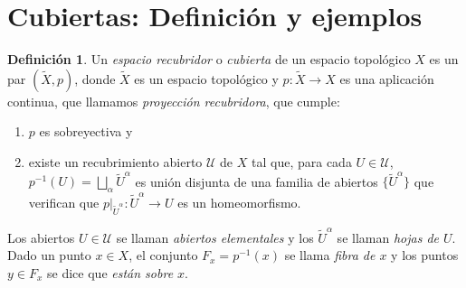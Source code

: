 \documentclass[12pt,a4paper]{book}
\theoremstyle{definition} \newtheorem{defn}[thm]{Definición}
\theoremstyle{definition} \newtheorem{ejemplo}[thm]{Ejemplo}
\theoremstyle{definition} \newtheorem{ejercicio}[thm]{Ejercicio}
\theoremstyle{remark} \newtheorem*{obs}{Observación}
\def\XX{\tilde{X}}
\begin{document}
\section{Cubiertas: Definición y ejemplos}
\begin{defn}
  Un \emph{espacio recubridor} o \emph{cubierta} de un espacio topológico $X$ es un par $(\XX,p)$, donde $\XX$ es un espacio topológico y $p:\XX\rightarrow X$ es una aplicación continua, que llamamos \emph{proyección recubridora}, que cumple:
  \begin{enumerate}
    \item $p$ es sobreyectiva y
    \item existe un recubrimiento abierto $\mathcal{U}$ de $X$ tal que, para cada $U\in \mathcal{U}$, $p^{-1}(U)=\bigsqcup_{\alpha}\tilde{U}^{\alpha}$ es unión disjunta de una familia de abiertos $\{\tilde{U}^{\alpha}\}$ que verifican que $p|_{\tilde{U}^{\alpha}}:\tilde{U}^{\alpha}\rightarrow U$ es un homeomorfismo.
  \end{enumerate}

  Los abiertos $U\in \mathcal{U}$ se llaman \emph{abiertos elementales} y los $\tilde{U}^{\alpha}$ se llaman \emph{hojas de $U$}. Dado un punto $x\in X$, el conjunto $F_x=p^{-1}(x)$ se llama \emph{fibra de $x$} y los puntos $y\in F_x$ se dice que \emph{están sobre $x$}.
\end{defn}
\end{document}
